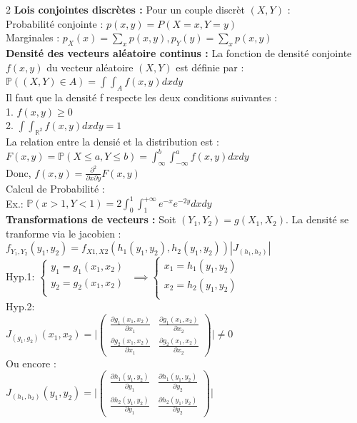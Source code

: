 \documentclass[11pt]{article}
\begin{document}
\begin{multicols}{2}
  \textbf{Lois conjointes discrètes :} Pour un couple discrèt $(X,Y)$ :\\
  Probabilité conjointe : $p(x,y) = P(X = x, Y = y)$\\
  Marginales : $p_X(x)=\sum_{x}p(x,y), p_Y(y)=\sum_{x}p(x,y)$\\

  \textbf{Densité des vecteurs aléatoire continus :} La fonction de densité conjointe $f(x, y)$ du vecteur aléatoire $(X, Y)$ est définie par : \\
  $\mathbb{P}((X,Y)\in A) = \int\int_{A}f(x,y)dxdy$\\
  Il faut que la densité f respecte les deux conditions suivantes : \\
  1. $f(x,y) \geq 0$ \\
  2. $\int \int_{\mathbb{R}^2} f(x,y) dx dy = 1$ \\
  La relation entre la densié et la distribution est :\\
  $F(x,y)=\mathbb{P}(X \leq a, Y \leq b)=\int_{\infty}^{b}\int_{-\infty}^{a}f(x,y)dxdy$\\
  Donc, $f(x,y)=\frac{\partial^2}{\partial x\partial y}F(x,y)$\\
  Calcul de Probabilité :\\
  Ex.: $\mathbb{P}(x > 1, Y < 1)=2\int_{0}^{1}\int_{1}^{+\infty}e^{-x}e^{-2y}dxdy$\\

  \textbf{Transformations de vecteurs :} Soit $(Y_1, Y_2)=g(X_1, X_2)$. La densité se tranforme via le jacobien :\\
  $f_{Y_1,Y_2}(y_1,y_2)=f_{X1,X2}(h_1(y_1,y_2), h_2(y_1,y_2)) |J_{(h_1,h_2)}|$\\
  Hyp.1: $\begin{cases}
  y_1 = g_1(x_1,x_2)\\
  y_2 = g_2(x_1,x_2)\\
  \end{cases}$ $\implies \begin{cases}
  x_1=h_1(y_1,y_2)\\
  x_2=h_2(y_1,y_2)\\
  \end{cases}$\\
  Hyp.2: \\
  $J_{(g_1,g_2)}(x_1,x_2) = \bigg|\begin{pmatrix}
    \frac{\partial g_1(x_1,x_2)}{\partial x_1} & \frac{\partial g_1(x_1,x_2)}{\partial x_2}\\
    \frac{\partial g_2(x_1,x_2)}{\partial x_1} & \frac{\partial g_2(x_1,x_2)}{\partial x_2}
  \end{pmatrix}\bigg| \neq 0$\\
  Ou encore : \\
  $J_{(h_1,h_2)}(y_1,y_2) = \bigg|\begin{pmatrix}
    \frac{\partial h_1(y_1,y_2)}{\partial y_1} & \frac{\partial h_1(y_1,y_2)}{\partial y_2}\\
    \frac{\partial h_2(y_1,y_2)}{\partial y_1} & \frac{\partial h_2(y_1,y_2)}{\partial y_2}
  \end{pmatrix}\bigg|$\\



\end{multicols}
\end{document}
